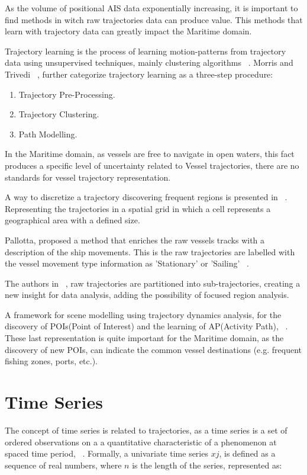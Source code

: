 As the volume of positional AIS data exponentially increasing, it is important to find methods in witch raw trajectories data can produce value. This methods that learn with trajectory data can greatly impact the Maritime domain.

Trajectory learning is the process of learning motion-patterns from trajectory data using unsupervised techniques, mainly clustering algorithms ~\cite{LeGuillarme2013}.
Morris and Trivedi ~\cite{Morris2008}, further categorize trajectory learning as a three-step procedure: 

\begin{enumerate}
\item Trajectory Pre-Processing.
\item Trajectory Clustering. 
\item Path Modelling.
\end{enumerate}

In the Maritime domain, as vessels are free to navigate in open waters, this fact produces a specific level of uncertainty related to Vessel trajectories, there are no standards for vessel trajectory representation.

A way to discretize a trajectory discovering frequent regions is presented in ~\cite{Lei2016}. Representing the trajectories in a spatial grid in which a cell represents a geographical area with a defined size.

Pallotta, proposed a method that enriches the raw vessels tracks with a description of the ship movements. This is the raw trajectories are labelled with the vessel movement type information as 'Stationary' or 'Sailing' ~\cite{Pallotta2013}.

The authors in ~\cite{Lee}, raw trajectories are partitioned into sub-trajectories, creating a new insight for data analysis, adding the possibility of focused region analysis.  

A framework for scene modelling using trajectory dynamics analysis, for the discovery of POIs(Point of Interest) and the learning of AP(Activity Path), ~\cite{Morris2008}. 
These last representation is quite important for the Maritime domain, as the discovery of new POIs, can indicate the common vessel destinations (e.g. frequent fishing zones, ports, etc.).  

\section{Time Series}
\label{section: Time Series}
The concept of time series is related to trajectories, as a time series is a set of ordered observations on a a quantitative characteristic of a
phenomenon at spaced time period, ~\cite{Ivanovic2016b}. Formally, a univariate time series $xj$, is defined as a sequence of real numbers, where $n$ is the length of the series, represented as:

